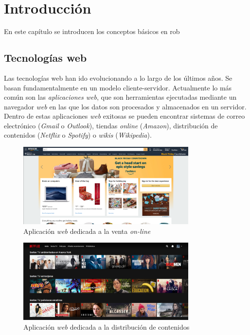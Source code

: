 \chapter{Introducción}
\label{chap:intro}
En este capítulo se introducen los conceptos básicos en rob

\section{Tecnologías web}
\label{sec:web}
Las tecnologías web han ido evolucionando a lo largo de los últimos años. Se basan fundamentalmente en un modelo cliente-servidor. Actualmente lo más común son las \textit{aplicaciones web}, que son herramientas ejecutadas mediante un navegador \textit{web} en las que los datos son procesados y almacenados en un servidor. Dentro de estas aplicaciones \textit{web} exitosas se pueden encontrar sistemas de correo electrónico (\textit{Gmail}  o \textit{Outlook}), tiendas \textit{online} (\textit{Amazon}), distribución de contenidos (\textit{Netflix} o \textit{Spotify}) o \textit{wikis} (\textit{Wikipedia}).


    \begin{figure}[H]
    \centering
    \includegraphics[width=0.8\textwidth]{img/amazon.png}
    \caption{Aplicación \textit{web} dedicada a la venta \textit{on-line}} \label{fig:amazon}
    \end{figure}

    \begin{figure}[H]
    \centering
    \includegraphics[width=0.8\textwidth]{img/netflix.png}
    \caption{Aplicación \textit{web} dedicada a la distribución de contenidos} \label{fig:netflix}
    \end{figure}
